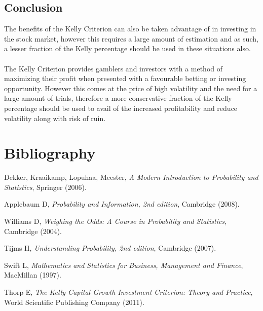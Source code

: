 \documentclass[12pt]{article}
\begin{document}
\subsection{Conclusion}
The benefits of the Kelly Criterion can also be taken advantage of in investing in the stock market, however this requires a large amount of estimation and as such, a lesser fraction of the Kelly percentage should be used in these situations also.
\\\\
The Kelly Criterion provides gamblers and investors with a method of maximizing their profit when presented with a favourable betting or investing opportunity. However this comes at the price of high volatility and the need for a large amount of trials, therefore a more conservative fraction of the Kelly percentage should be used to avail of the increased profitability and reduce volatility along with risk of ruin.\cite{thorp}

\clearpage
\section{Bibliography}
\begin{thebibliography}{3}
  Dekker, Kraaikamp, Lopuhaa, Meester,
  \emph{A Modern Introduction to Probability and Statistics},
  Springer (2006).
  
  Applebaum D,
  \emph{Probability and Information, 2nd edition},
  Cambridge (2008).
  
  Williams D,
  \emph{Weighing the Odds: A Course in Probability and Statistics},
  Cambridge (2004).
  
  Tijms H,
  \emph{Understanding Probability, 2nd edition},
  Cambridge (2007).
  
  Swift L,
  \emph{Mathematics and Statistics for Business, Management and Finance},
  MacMillan (1997).
  
  Thorp E,
  \emph{The Kelly Capital Growth Investment Criterion: Theory and Practice},
  World Scientific Publishing Company (2011).
  
\end{thebibliography}
\end{document}
